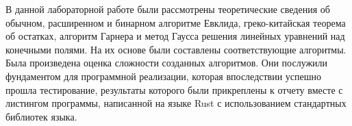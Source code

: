 \documentclass[bachelor, och, labwork]{shiza}
\begin{document}
\conclusion

    В данной лабораторной работе были рассмотрены теоретические сведения об
    обычном, расширенном и бинарном алгоритме Евклида, греко-китайская теорема
    об остатках, алгоритм Гарнера и метод Гаусса решения линейных уравнений над
    конечными полями. На их основе были составлены соответствующие алгоритмы.
    Была произведена оценка сложности созданных алгоритмов. Они послужили
    фундаментом для программной реализации, которая впоследствии успешно прошла
    тестирование, результаты которого были прикреплены к отчету вместе с
    листингом программы, написанной на языке Rust с использованием стандартных
    библиотек языка.
\end{document}
